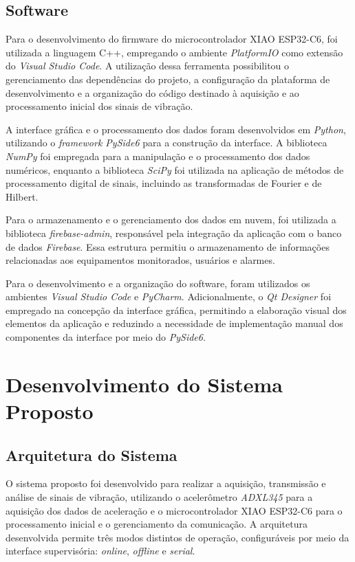 \documentclass[conference]{IEEEtran}
\begin{document}
\renewcommand{\tablename}{Table}
\subsection{Software}
Para o desenvolvimento do firmware do microcontrolador XIAO ESP32-C6, foi utilizada a linguagem C++, empregando o ambiente \textit{PlatformIO} como extensão do \textit{Visual Studio Code}. A utilização dessa ferramenta possibilitou o gerenciamento das dependências do projeto, a configuração da plataforma de desenvolvimento e a organização do código destinado à aquisição e ao processamento inicial dos sinais de vibração.

A interface gráfica e o processamento dos dados foram desenvolvidos em \textit{Python}, utilizando o \textit{framework PySide6} para a construção da interface. A biblioteca \textit{NumPy} foi empregada para a manipulação e o processamento dos dados numéricos, enquanto a biblioteca \textit{SciPy} foi utilizada na aplicação de métodos de processamento digital de sinais, incluindo as transformadas de Fourier e de Hilbert.

Para o armazenamento e o gerenciamento dos dados em nuvem, foi utilizada a biblioteca \textit{firebase-admin}, responsável pela integração da aplicação com o banco de dados \textit{Firebase}. Essa estrutura permitiu o armazenamento de informações relacionadas aos equipamentos monitorados, usuários e alarmes.

Para o desenvolvimento e a organização do software, foram utilizados os ambientes \textit{Visual Studio Code} e \textit{PyCharm}. Adicionalmente, o \textit{Qt Designer} foi empregado na concepção da interface gráfica, permitindo a elaboração visual dos elementos da aplicação e reduzindo a necessidade de implementação manual dos componentes da interface por meio do \textit{PySide6}.

\section{Desenvolvimento do Sistema Proposto}

\subsection{Arquitetura do Sistema}

O sistema proposto foi desenvolvido para realizar a aquisição, transmissão e análise de sinais de vibração, utilizando o acelerômetro \textit{ADXL345} para a aquisição dos dados de aceleração e o microcontrolador XIAO ESP32-C6 para o processamento inicial e o gerenciamento da comunicação. A arquitetura desenvolvida permite três modos distintos de operação, configuráveis por meio da interface supervisória: \textit{online}, \textit{offline} e \textit{serial}.
\end{document}
